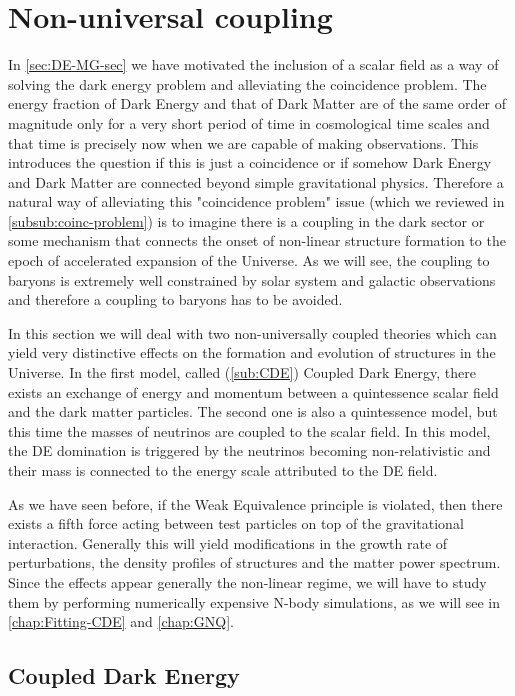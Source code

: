 \section{Non-universal coupling \label{sec:nonuniversal-coupling}}

In \cref{sec:DE-MG-sec} we have motivated the inclusion of a scalar field as a 
way of solving the dark energy problem and alleviating the coincidence problem.
The energy fraction of Dark Energy and that of Dark Matter are of the same
order of magnitude only for a very short period of time in cosmological time scales and that time is precisely
now when we are capable of making observations. This introduces the question if this is just a coincidence or 
if somehow Dark Energy and Dark Matter are connected beyond simple gravitational physics.
Therefore a natural way of alleviating this "coincidence problem" issue (which we reviewed in \cref{subsub:coinc-problem})
is to imagine there is a coupling in the dark sector or some mechanism that connects the onset of non-linear 
structure formation to the epoch of accelerated expansion of the Universe. As we will see, the coupling to baryons 
is extremely well constrained by solar system and galactic observations and therefore a coupling to baryons 
has to be avoided.

In this section we will deal with two non-universally coupled theories which can yield very distinctive 
effects on the formation and evolution of structures in the Universe.
In the first model, called (\cref{sub:CDE}) Coupled Dark Energy, there exists an exchange of energy and momentum
between a quintessence scalar field and the dark matter particles. 
The second one is also a quintessence model, but this time the masses of neutrinos are 
coupled to the scalar field. In this model, the DE domination is triggered by the neutrinos becoming non-relativistic
and their mass is connected to the energy scale attributed to the DE field.

As we have seen before, if the Weak Equivalence principle is violated, then there exists a fifth force acting between test
particles on top of the gravitational interaction. Generally this will yield modifications in the growth rate of perturbations, 
the density profiles of structures and the matter power spectrum. Since the effects appear generally the non-linear regime,
we will have to study them by performing numerically expensive N-body simulations, as we will see in \cref{chap:Fitting-CDE}
and \cref{chap:GNQ}.


\subsection{Coupled Dark Energy \label{sub:CDE}}

